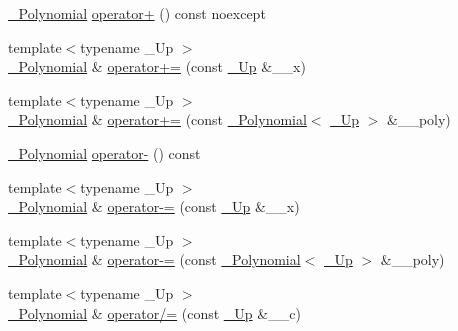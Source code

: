 \begin{DoxyCompactItemize}
\item 
\hyperlink{class____gnu__cxx_1_1__Polynomial}{\+\_\+\+Polynomial} \hyperlink{class____gnu__cxx_1_1__Polynomial_acbaf9cbeb167e41490d976a083f131d8}{operator+} () const noexcept
\item 
{\footnotesize template$<$typename \+\_\+\+Up $>$ }\\\hyperlink{class____gnu__cxx_1_1__Polynomial}{\+\_\+\+Polynomial} \& \hyperlink{class____gnu__cxx_1_1__Polynomial_a68658f4f4692cd8a840919123d03995a}{operator+=} (const \hyperlink{class____gnu__cxx_1_1__Polynomial_a242114d4b86648a5dff67a8221f80d40}{\+\_\+\+Up} \&\+\_\+\+\_\+x)
\item 
{\footnotesize template$<$typename \+\_\+\+Up $>$ }\\\hyperlink{class____gnu__cxx_1_1__Polynomial}{\+\_\+\+Polynomial} \& \hyperlink{class____gnu__cxx_1_1__Polynomial_ac7b0aafe9829a3eae65f79a99881fac2}{operator+=} (const \hyperlink{class____gnu__cxx_1_1__Polynomial}{\+\_\+\+Polynomial}$<$ \hyperlink{class____gnu__cxx_1_1__Polynomial_a242114d4b86648a5dff67a8221f80d40}{\+\_\+\+Up} $>$ \&\+\_\+\+\_\+poly)
\item 
\hyperlink{class____gnu__cxx_1_1__Polynomial}{\+\_\+\+Polynomial} \hyperlink{class____gnu__cxx_1_1__Polynomial_a814ac6ceea7d2b6d42c371b4d631b47f}{operator-\/} () const
\item 
{\footnotesize template$<$typename \+\_\+\+Up $>$ }\\\hyperlink{class____gnu__cxx_1_1__Polynomial}{\+\_\+\+Polynomial} \& \hyperlink{class____gnu__cxx_1_1__Polynomial_a4fa6ae9adb4c4f946839d29b033ededb}{operator-\/=} (const \hyperlink{class____gnu__cxx_1_1__Polynomial_a242114d4b86648a5dff67a8221f80d40}{\+\_\+\+Up} \&\+\_\+\+\_\+x)
\item 
{\footnotesize template$<$typename \+\_\+\+Up $>$ }\\\hyperlink{class____gnu__cxx_1_1__Polynomial}{\+\_\+\+Polynomial} \& \hyperlink{class____gnu__cxx_1_1__Polynomial_af092dce5f209610ec20ea84ccfe0a5f1}{operator-\/=} (const \hyperlink{class____gnu__cxx_1_1__Polynomial}{\+\_\+\+Polynomial}$<$ \hyperlink{class____gnu__cxx_1_1__Polynomial_a242114d4b86648a5dff67a8221f80d40}{\+\_\+\+Up} $>$ \&\+\_\+\+\_\+poly)
\item 
{\footnotesize template$<$typename \+\_\+\+Up $>$ }\\\hyperlink{class____gnu__cxx_1_1__Polynomial}{\+\_\+\+Polynomial} \& \hyperlink{class____gnu__cxx_1_1__Polynomial_a07401b2f492b32805170f7c0cf4c326a}{operator/=} (const \hyperlink{class____gnu__cxx_1_1__Polynomial_a242114d4b86648a5dff67a8221f80d40}{\+\_\+\+Up} \&\+\_\+\+\_\+c)

\end{DoxyCompactItemize}
